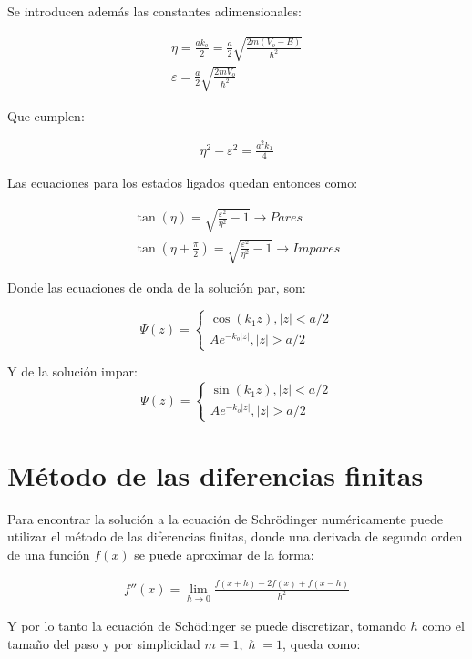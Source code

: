 \documentclass[a4paper]{article}
\theoremstyle{definition}
\theoremstyle{plain}
\begin{document}
Se introducen además las constantes adimensionales:

\begin{align*}
    \eta = \frac{ak_o}{2} = \frac{a}{2}\sqrt{\frac{2m(V_o - E)}{\hslash^2}} \\
    \varepsilon = \frac{a}{2}\sqrt{\frac{2m V_o}{\hslash^2}}
\end{align*}

Que cumplen:

\begin{align*}
    \eta^2 - \varepsilon^2  = \frac{a^2k_1}{4} 
\end{align*}


Las ecuaciones para los estados ligados quedan entonces como:

\begin{align*}
    \tan(\eta) = \sqrt{\frac{\varepsilon^2}{\eta^2}-1} \longrightarrow Pares \\
    \tan \left(\eta + \frac{\pi}{2} \right) = \sqrt{\frac{\varepsilon^2}{\eta^2}-1} \longrightarrow Impares
\end{align*}


Donde las ecuaciones de onda de la solución par, son:

$$\Psi(z) = 
\begin{cases}
    \cos{(k_1 z)}, |z| < a/2 \\
     A e^{-k_o|z|}, |z| > a/2
\end{cases}
$$

Y de la solución impar:
$$\Psi(z) = 
\begin{cases}
    \sin{(k_1 z)}, |z| < a/2 \\
     A e^{-k_o|z|}, |z| > a/2
\end{cases}
$$


\section{Método de las diferencias finitas}

Para encontrar la solución a la ecuación de Schrödinger numéricamente puede utilizar el método de las diferencias finitas, donde una derivada de segundo orden de una función $f(x)$ se puede aproximar de la forma: 

\begin{align*}
    f''(x) = \lim_{h \rightarrow 0} \frac{f(x+h) - 2f(x) + f(x-h)}{h^2} 
\end{align*}

Y por lo tanto la ecuación de Schödinger se puede discretizar, tomando $h$ como el tamaño del paso y por simplicidad $m=1, \hslash = 1$, queda como:
\end{document}
